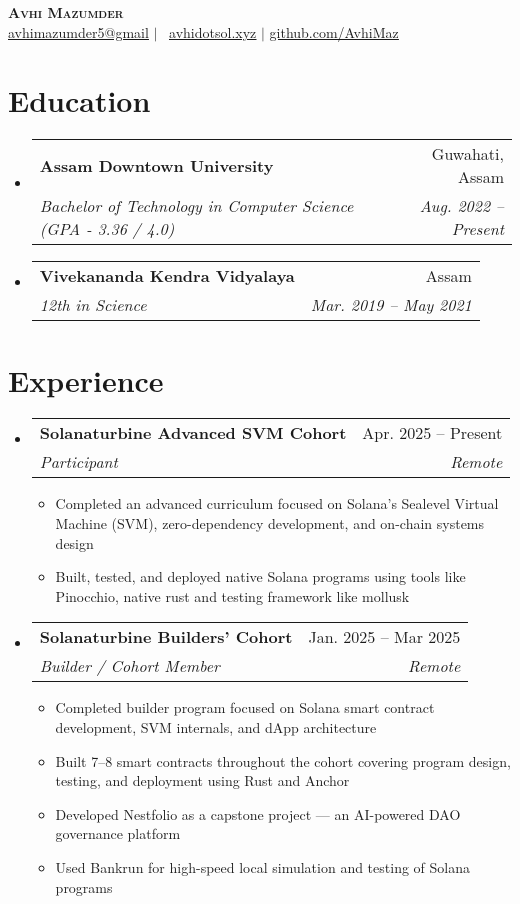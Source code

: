 \documentclass[letterpaper,11pt]{article}
\makeatletter
\newcommand{\resumeItem}[1]{
  \item\small{
    {#1 \vspace{-2pt}}
  }
}
\newcommand{\resumeSubheading}[4]{
  \vspace{-2pt}\item
    \begin{tabular*}{0.97\textwidth}[t]{l@{\extracolsep{\fill}}r}
      \textbf{#1} & #2 \\
      \textit{\small#3} & \textit{\small #4} \\
    \end{tabular*}\vspace{-7pt}
}
\newcommand{\resumeSubHeadingListStart}{\begin{itemize}[leftmargin=0.15in, label={}]}
\newcommand{\resumeSubHeadingListEnd}{\end{itemize}}
\newcommand{\resumeItemListStart}{\begin{itemize}}
\newcommand{\resumeItemListEnd}{\end{itemize}\vspace{-5pt}}
\makeatother
\begin{document}
\begin{center}
    \textbf{\Huge \scshape Avhi Mazumder} \\ \vspace{1pt}
    \small\href{mailto:avhimazumder5@gmail.com}{\underline{avhimazumder5@gmail}} $|$ \
    \href{https://avhidotsol.xyz/}{\underline{avhidotsol.xyz}} $|$
    \href{https://github.com/AvhiMaz}{\underline{github.com/AvhiMaz}}
\end{center}


\section{Education}
  \resumeSubHeadingListStart
    \resumeSubheading
      {Assam Downtown University}{Guwahati, Assam}
      {Bachelor of Technology in Computer Science (GPA - 3.36 / 4.0)}{Aug. 2022 -- Present}
    \resumeSubheading
      {Vivekananda Kendra Vidyalaya}{Assam}
      {12th in Science}{Mar. 2019 -- May 2021}
  \resumeSubHeadingListEnd


\section{Experience}
  \resumeSubHeadingListStart

    \resumeSubheading
      {Solanaturbine Advanced SVM Cohort}{Apr. 2025 -- Present}
      {Participant}{Remote}
      \resumeItemListStart
        \resumeItem{Completed an advanced curriculum focused on Solana's Sealevel Virtual Machine (SVM), zero-dependency development, and on-chain systems design}
        \resumeItem{Built, tested, and deployed native Solana programs using tools like Pinocchio, native rust and testing framework like mollusk}
      \resumeItemListEnd
    \resumeSubheading
      {Solanaturbine Builders' Cohort}{Jan. 2025 -- Mar 2025}
      {Builder / Cohort Member}{Remote}
    \resumeItemListStart
      \resumeItem{Completed builder program focused on Solana smart contract development, SVM internals, and dApp architecture}
      \resumeItem{Built 7–8 smart contracts throughout the cohort covering program design, testing, and deployment using Rust and Anchor}
      \resumeItem{Developed Nestfolio as a capstone project — an AI-powered DAO governance platform}
      \resumeItem{Used Bankrun for high-speed local simulation and testing of Solana programs}
    \resumeItemListEnd
  \resumeSubHeadingListEnd


\end{document}
